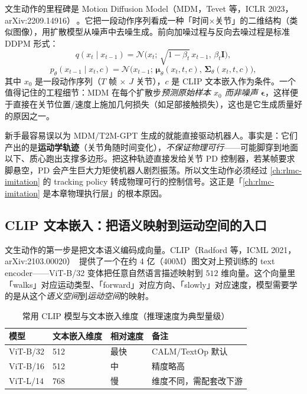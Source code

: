 文生动作的里程碑是 Motion Diffusion Model（MDM，Tevet 等，ICLR 2023，arXiv:2209.14916）\,\cite{tevet2023mdm}。它把一段动作序列看成一种「时间$\times$关节」的二维结构（类似图像），用扩散模型从噪声中去噪生成。前向加噪过程与反向去噪过程是标准 DDPM 形式：
\begin{equation}
q(x_t \mid x_{t-1}) = \mathcal{N}\!\big(x_t;\, \sqrt{1-\beta_t}\,x_{t-1},\, \beta_t \mathbf{I}\big),
\label{eq:rlmc-mm-fwd}
\end{equation}
\begin{equation}
p_\theta(x_{t-1} \mid x_t, c) = \mathcal{N}\!\big(x_{t-1};\, \boldsymbol\mu_\theta(x_t, t, c),\, \boldsymbol\Sigma_\theta(x_t, t, c)\big),
\label{eq:rlmc-mm-rev}
\end{equation}
其中 $x_0$ 是一段动作序列（$T$ 帧 $\times$ $J$ 关节），$c$ 是 CLIP 文本嵌入作为条件。一个值得记住的工程细节：MDM 在每个扩散步\emph{预测原始样本 $x_0$ 而非噪声 $\boldsymbol\epsilon$}，这样便于直接在关节位置/速度上施加几何损失（如足部接触损失），这也是它生成质量好的原因之一。

\begin{insight}\label{ins:rlmc-mm-kinematic}
新手最容易误以为 MDM/T2M-GPT 生成的就能直接驱动机器人。事实是：它们产出的是\textbf{运动学轨迹}（关节角随时间变化），\emph{不保证物理可行}——可能脚穿到地面以下、质心跑出支撑多边形。把这种轨迹直接发给关节 PD 控制器，若某帧要求脚悬空，PD 会产生巨大力矩使机器人剧烈振荡。所以文生动作必须经过 \cref{ch:rlmc-imitation} 的 tracking policy 转成物理可行的控制信号。这正是「\cref{ch:rlmc-imitation} 是本章物理执行层」的根本原因。
\end{insight}

\subsection{CLIP 文本嵌入：把语义映射到运动空间的入口}
\label{sec:rlmc-mm-clip}

文生动作的第一步是把文本语义编码成向量。CLIP（Radford 等，ICML 2021，arXiv:2103.00020）\,\cite{radford2021clip} 提供了一个在约 4 亿（400M）图文对上预训练的 text encoder——ViT-B/32 变体把任意自然语言描述映射到 $512$ 维向量。这个向量里「walks」对应运动类型、「forward」对应方向、「slowly」对应速度，模型需要学的是从这个\emph{语义空间}到\emph{运动空间}的映射。

\begin{table}[ht]
\centering
\small
\caption{常用 CLIP 模型与文本嵌入维度（推理速度为典型量级）}
\label{tab:rlmc-mm-clip}
\begin{tabular}{@{}llll@{}}
\toprule
模型 & 文本嵌入维度 & 相对速度 & 备注 \\
\midrule
ViT-B/32 & 512 & 最快 & CALM/TextOp 默认 \\
ViT-B/16 & 512 & 中 & 精度略高 \\
ViT-L/14 & 768 & 慢 & 维度不同，需配套改下游 \\
\bottomrule
\end{tabular}
\end{table}

